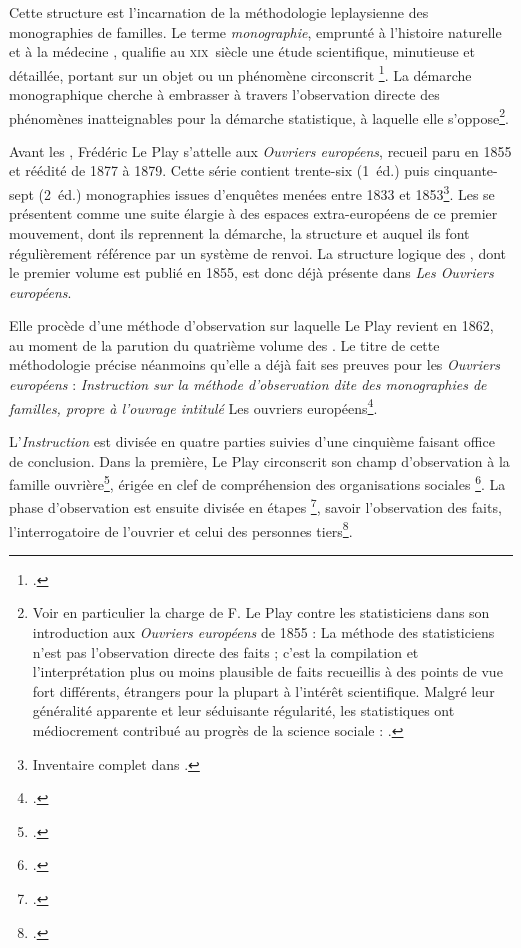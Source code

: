 Cette structure est l'incarnation de la méthodologie leplaysienne des monographies de familles. Le terme \textit{monographie}, \og emprunté à l'histoire naturelle et à la médecine \fg{}, qualifie au \textsc{xix}\ieme ~siècle une \og étude scientifique, minutieuse et détaillée, portant sur un objet ou un phénomène circonscrit \fg{}\footnote{\cite[p. 12]{savoye2}.}. La démarche monographique cherche à embrasser à travers l'observation directe des phénomènes inatteignables pour la démarche statistique, à laquelle elle s'oppose\footnote{Voir en particulier la charge de F. Le Play contre les statisticiens dans son introduction aux \textit{Ouvriers européens} de 1855 : \og La méthode des statisticiens n'est pas l'observation directe des faits ; c'est la compilation et l'interprétation plus ou moins plausible de faits recueillis à des points de vue fort différents, étrangers pour la plupart à l'intérêt scientifique. Malgré leur généralité apparente et leur séduisante régularité, les statistiques ont médiocrement contribué au progrès de la science sociale \fg{} : \cite[p.~11]{oe1855}.}.

Avant les \odm, Frédéric Le Play s'attelle aux \textit{Ouvriers européens}, recueil paru en 1855 et réédité de 1877 à 1879. Cette série contient trente-six (1\iere{}~éd.) puis cinquante-sept (2\ieme{}~éd.) monographies issues d'enquêtes menées entre 1833 et 1853\footnote{Inventaire complet dans \cite[p. 106-112]{lorry}.}. Les \odm{} se présentent comme une suite élargie à des espaces extra-européens de ce premier mouvement, dont ils reprennent la démarche, la structure et auquel ils font régulièrement référence par un système de renvoi. La structure logique des \odm{}, dont le premier volume est publié en 1855, est donc déjà présente dans \textit{Les Ouvriers européens}.

Elle procède d'une méthode d'observation sur laquelle Le Play revient en 1862, au moment de la parution du quatrième volume des \odm{}. Le titre de cette méthodologie précise néanmoins qu'elle a déjà fait ses preuves pour les \textit{Ouvriers européens} : \textit{Instruction sur la méthode d'observation dite des monographies de familles, propre à l'ouvrage intitulé} Les ouvriers européens\footcite{instruction62}.

L'\textit{Instruction} est divisée en quatre parties suivies d'une cinquième faisant office de conclusion. Dans la première, Le Play circonscrit son champ d'observation à la famille ouvrière\footcite[I., \og Remarques préliminaires sur l'étude des faits sociaux et sur la méthode des monographies de familles \fg{}, p. 15-16]{instruction62}, érigée en \og clef de compréhension des organisations sociales \fg{}\footcite[p. 15]{savoye2}. La phase d'observation est ensuite divisée en étapes \footcite[II., \og Règles à suivre pour procéder à l'observation des faits sociaux \fg{}, p. 17-19]{instruction62}, savoir l'observation des faits, l'interrogatoire de l'ouvrier et celui des personnes tiers\footcite[p. 16]{savoye2}.

